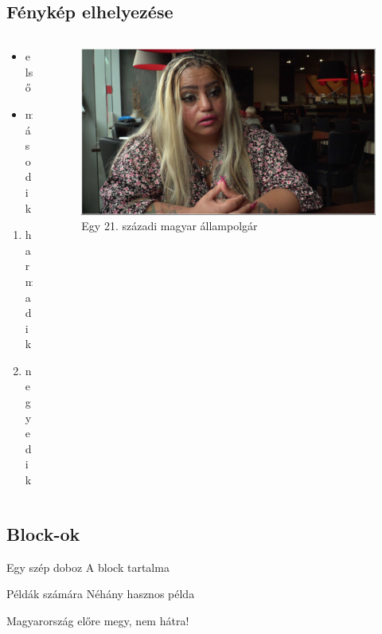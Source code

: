 \documentclass[aspectratio=169,12pt]{beamer}
\begin{document}
\subsection{Fénykép elhelyezése}
\begin{frame}
	\begin{columns}[c]
		\begin{column}{0.5\linewidth}
			\begin{itemize}
				\item első
				\item második
			\end{itemize}
			
			\begin{enumerate}
				\item harmadik
				\item negyedik
			\end{enumerate}
		\end{column}
		
		\begin{column}{0.5\linewidth}
			\begin{figure}
				\centering
				\includegraphics[scale=0.1]{irén.png}
				\caption{Egy 21. századi magyar állampolgár}
			\end{figure}		
		\end{column}
	\end{columns}
\end{frame}

\subsection{Block-ok}
\begin{frame}
	\begin{block}{Egy szép doboz}
		A block tartalma
	\end{block}

	\pause	
	
	\begin{exampleblock}{Példák számára}
		Néhány hasznos példa
	\end{exampleblock}
	
	\begin{alertblock}{}
		Magyarország előre megy, nem hátra!
	\end{alertblock}
\end{frame}
\end{document}
